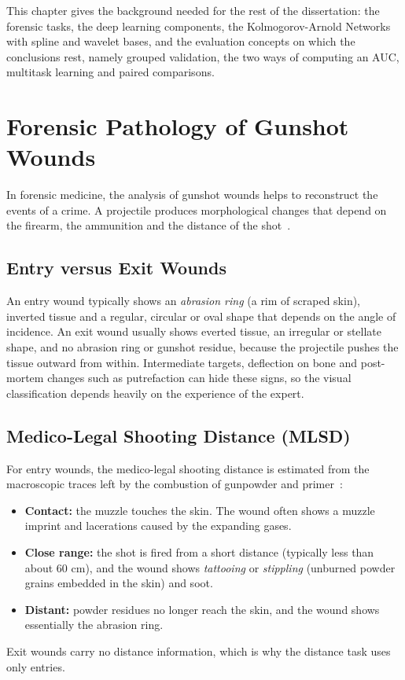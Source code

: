 \label{chap:background}

This chapter gives the background needed for the rest of the dissertation: the forensic tasks, the deep learning components, the Kolmogorov-Arnold Networks with spline and wavelet bases, and the evaluation concepts on which the conclusions rest, namely grouped validation, the two ways of computing an AUC, multitask learning and paired comparisons.

\section{Forensic Pathology of Gunshot Wounds}
\label{sec:forensic_background}

In forensic medicine, the analysis of gunshot wounds helps to reconstruct the events of a crime. A projectile produces morphological changes that depend on the firearm, the ammunition and the distance of the shot~\cite{dimaio2015gunshot,saukko2016knight}.

\subsection{Entry versus Exit Wounds}
An entry wound typically shows an \textit{abrasion ring} (a rim of scraped skin), inverted tissue and a regular, circular or oval shape that depends on the angle of incidence. An exit wound usually shows everted tissue, an irregular or stellate shape, and no abrasion ring or gunshot residue, because the projectile pushes the tissue outward from within. Intermediate targets, deflection on bone and post-mortem changes such as putrefaction can hide these signs, so the visual classification depends heavily on the experience of the expert.

\subsection{Medico-Legal Shooting Distance (MLSD)}
For entry wounds, the medico-legal shooting distance is estimated from the macroscopic traces left by the combustion of gunpowder and primer~\cite{dimaio2015gunshot}:
\begin{itemize}
    \item \textbf{Contact:} the muzzle touches the skin. The wound often shows a muzzle imprint and lacerations caused by the expanding gases.
    \item \textbf{Close range:} the shot is fired from a short distance (typically less than about 60 cm), and the wound shows \textit{tattooing} or \textit{stippling} (unburned powder grains embedded in the skin) and soot.
    \item \textbf{Distant:} powder residues no longer reach the skin, and the wound shows essentially the abrasion ring.
\end{itemize}
Exit wounds carry no distance information, which is why the distance task uses only entries.

